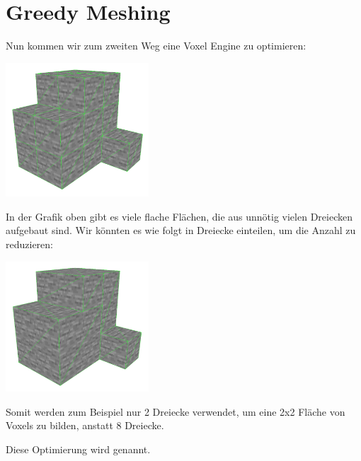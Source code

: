 \section{Greedy Meshing}

Nun kommen wir zum zweiten Weg eine Voxel Engine
zu optimieren:

\begin{center}
\includegraphics[width=0.4\textwidth]{../assets/greedy/stone_simple.png}
\end{center}

In der Grafik oben gibt es viele flache Flächen,
die aus unnötig vielen Dreiecken aufgebaut sind.
Wir könnten es wie folgt in Dreiecke einteilen,
um die Anzahl zu reduzieren:

\begin{center}
\includegraphics[width=0.4\textwidth]{../assets/greedy/stone_greedy.png}
\end{center}

Somit werden zum Beispiel nur 2 Dreiecke verwendet,
um eine 2x2 Fläche von Voxels zu bilden,
anstatt 8 Dreiecke.

Diese Optimierung wird  genannt.

{  }

{  }
